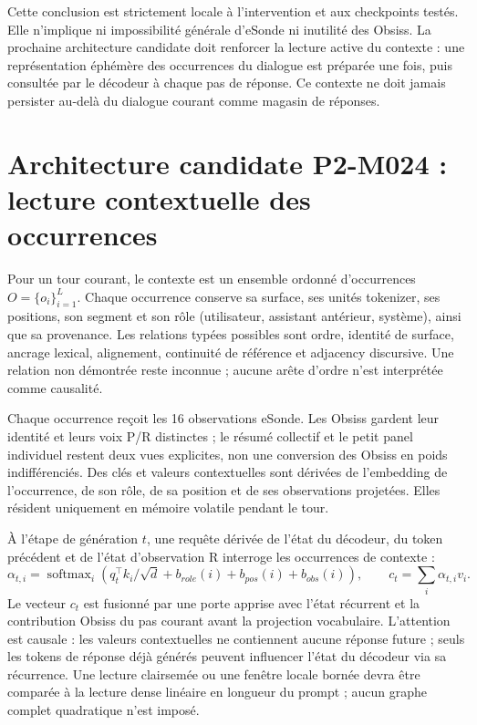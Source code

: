 \documentclass[11pt,a4paper]{report}
\begin{document}
Cette conclusion est strictement locale à l'intervention et aux checkpoints testés. Elle n'implique ni impossibilité générale d'eSonde ni inutilité des Obsiss. La prochaine architecture candidate doit renforcer la lecture active du contexte : une représentation éphémère des occurrences du dialogue est préparée une fois, puis consultée par le décodeur à chaque pas de réponse. Ce contexte ne doit jamais persister au-delà du dialogue courant comme magasin de réponses.

\section*{Architecture candidate P2-M024 : lecture contextuelle des occurrences}
Pour un tour courant, le contexte est un ensemble ordonné d'occurrences $O=\{o_i\}_{i=1}^{L}$. Chaque occurrence conserve sa surface, ses unités tokenizer, ses positions, son segment et son rôle (utilisateur, assistant antérieur, système), ainsi que sa provenance. Les relations typées possibles sont ordre, identité de surface, ancrage lexical, alignement, continuité de référence et adjacency discursive. Une relation non démontrée reste inconnue ; aucune arête d'ordre n'est interprétée comme causalité.

Chaque occurrence reçoit les 16 observations eSonde. Les Obsiss gardent leur identité et leurs voix P/R distinctes ; le résumé collectif et le petit panel individuel restent deux vues explicites, non une conversion des Obsiss en poids indifférenciés. Des clés et valeurs contextuelles sont dérivées de l'embedding de l'occurrence, de son rôle, de sa position et de ses observations projetées. Elles résident uniquement en mémoire volatile pendant le tour.

À l'étape de génération $t$, une requête dérivée de l'état du décodeur, du token précédent et de l'état d'observation R interroge les occurrences de contexte :
\[
\alpha_{t,i}=\operatorname{softmax}_i\left(q_t^\top k_i/\sqrt{d}+b_{role}(i)+b_{pos}(i)+b_{obs}(i)\right),\qquad
c_t=\sum_i\alpha_{t,i}v_i.
\]
Le vecteur $c_t$ est fusionné par une porte apprise avec l'état récurrent et la contribution Obsiss du pas courant avant la projection vocabulaire. L'attention est causale : les valeurs contextuelles ne contiennent aucune réponse future ; seuls les tokens de réponse déjà générés peuvent influencer l'état du décodeur via sa récurrence. Une lecture clairsemée ou une fenêtre locale bornée devra être comparée à la lecture dense linéaire en longueur du prompt ; aucun graphe complet quadratique n'est imposé.
\end{document}
